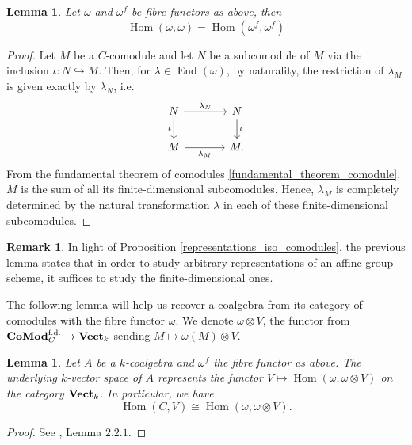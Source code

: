 \documentclass{article}
\theoremstyle{plain}
\newtheorem{lemma}[theorem]{Lemma}
\theoremstyle{definition}
\newtheorem{remark}{Remark}
\DeclareMathOperator{\Hom}{Hom}
\DeclareMathOperator{\End}{End}
\DeclareMathOperator{\Vect}{\bf{Vect}}
\DeclareMathOperator{\Comod}{\bf{CoMod}}
\begin{document}
\begin{lemma}
    Let $\omega$ and $\omega^f$ be fibre functors as above, then
    $$\Hom(\omega,\omega) =\Hom(\omega^f,\omega^f)$$
\end{lemma}
\begin{proof}
    Let $M$ be a $C$-comodule and let $N$ be a subcomodule of $M$ via the inclusion $\iota :N \hookrightarrow M$. Then, for $\lambda\in\End(\omega)$, by naturality, the restriction of $\lambda_M$ is given exactly by $\lambda_N$, i.e.
    \[
    \begin{tikzcd}[column sep = large]
        N \arrow[r,"\lambda_N"]\arrow[d,"\iota"'] & N\arrow[d,"\iota"]\\
        M\arrow[r,"\lambda_M"'] & M.
    \end{tikzcd}
    \]
    From the fundamental theorem of comodules \ref{fundamental_theorem_comodule}, $M$ is the sum of all its finite-dimensional subcomodules.
    Hence, $\lambda_M$ is completely determined by the natural transformation $\lambda$ in each of these finite-dimensional subcomodules.
\end{proof}

\begin{remark}
    In light of Proposition \ref{representations_iso_comodules},
    the previous lemma states that in order to study arbitrary representations of an affine group scheme, it suffices to study the finite-dimensional ones.
\end{remark}

\noindent The following lemma will help us recover a coalgebra from its category of comodules with the fibre functor $\omega$. 
We denote $\omega\otimes V$, the functor from $\Comod^{\text{f.d.}}_C\rightarrow \Vect_k$ sending $M\mapsto \omega(M)\otimes V$.

\begin{lemma}
\label{useful_lemma_underlying_coalgebra}
    Let $A$ be a $k$-coalgebra and $\omega^f$ the fibre functor as above.
    The underlying $k$-vector space of $A$ represents the functor $V\mapsto \Hom(\omega, \omega\otimes V)$ on the category $\Vect_k$. In particular, we have 
    $$\Hom(C,V) \cong \Hom(\omega, \omega\otimes V).$$
\end{lemma}
\begin{proof}
    See \cite{Schauenburg}, Lemma $2.2.1$. 
\end{proof}


\end{document}
